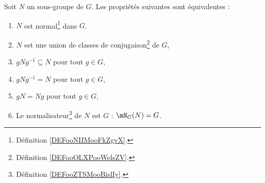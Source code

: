 \begin{proposition}\label{propGroupeNormal}
	Soit \( N\) un sous-groupe de \( G\). Les propriétés suivantes sont équivalentes :
	\begin{enumerate}
		\item       \label{ITEMooDYEUooOuKEqQ}
		      \( N\) est normal\footnote{Définition \ref{DEFooNIIMooFkZgvX}.} dans \( G\).
		\item       \label{ITEMooPYTEooZhvrUa}
		      \( N\) est une union de classes de conjugaison\footnote{Définition \ref{DEFooOLXPooWelsZV}.} de \( G\),
		\item       \label{ITEMooJWTLooBRmriQ}
		      \( gNg^{-1}\subseteq N\) pour tout \( g\in G\),
		\item       \label{ITEMooVRZIooAorhRY}
		      \( gNg^{-1}= N\) pour tout \( g\in G\),
		\item       \label{ITEMooJGUOooYshOZa}
		      \( gN=Ng\) pour tout \( g\in G\),
		\item       \label{ITEMooMRYRooZifCCe}
		      Le normalisateur\footnote{Définition \ref{DEFooZTSMooBislIy}.} de \( N\) est \( G\) : \( \mN_G(N)=G\).
	\end{enumerate}
\end{proposition}


